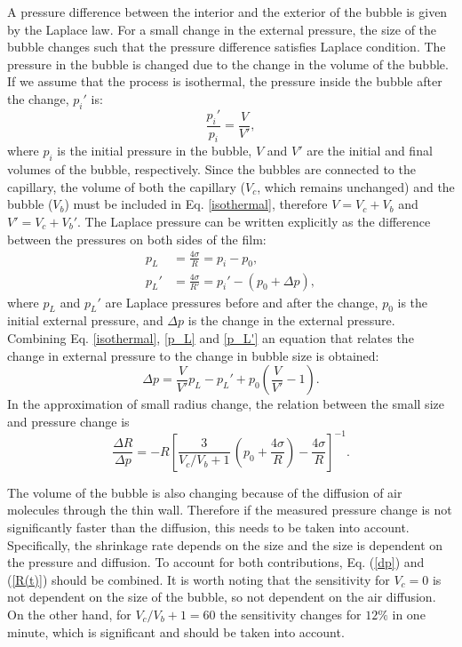 \documentclass[a4paper,12pt]{article}
\begin{document}
	A pressure difference between the interior and the exterior of the bubble is given by the Laplace law. For a small change in the external pressure, the size of the bubble changes such that the pressure difference satisfies Laplace condition.
	The pressure in the bubble is changed due to the change in the volume of the bubble.
	If we assume that the process is isothermal, the pressure inside the bubble after the change, $p_i'$ is:
	\begin{equation}
	\frac{p_i'}{p_i}=\frac{V}{V'},
	\label{isothermal}
	\end{equation}
	where $p_i$ is the initial pressure in the bubble, $V$ and $V'$ are the initial and final volumes of the bubble, respectively.	Since the bubbles are connected to the capillary, the volume of both the capillary ($V_c$, which remains unchanged) and the bubble ($V_b$) must be included in Eq. \eqref{isothermal}, therefore $V=V_c+V_b$ and $V'=V_c+V_b'$.
	The Laplace pressure can be written explicitly as the difference between the pressures on both sides of the film:
	\begin{align}
	\label{p_L}
	p_L&=\frac{4\sigma}{R}=p_i-p_0,\\ 
	\label{p_L'}
	p_L'&=\frac{4\sigma}{R'}=p_i'-(p_0+\Delta p),
	\end{align}
	where $p_L$ and $p_L'$ are Laplace pressures before and after the change, $p_0$ is the initial external pressure, and $\Delta p$ is the change in the external pressure.
	Combining  Eq. \eqref{isothermal}, \eqref{p_L} and \eqref{p_L'} an equation that relates the change in external pressure to the change in bubble size is obtained:
	\begin{equation}
	\Delta p = \frac{V}{V'}p_L - p_L' + p_0\left(\frac{V}{V'}-1\right). \label{dp}
	\end{equation}
	In the approximation of small radius change, the relation between the small size and pressure change is
	\begin{equation}
	\frac{\Delta R}{\Delta p} = - R\left[\frac{3}{V_c/V_b+1}\,\left(p_0+\frac{4\sigma}{R}\right) - \frac{4\sigma}{R}\right]^{-1}.
	\end{equation}
	
    The volume of the bubble is also changing because of the diffusion of air molecules through the thin wall. Therefore if the measured pressure change is not significantly faster than the diffusion, this needs to be taken into account. Specifically, the shrinkage rate depends on the size and the size is dependent on the pressure and diffusion. To account for both contributions, Eq. (\ref{dp}) and (\ref{R(t)}) should be combined. It is worth noting that the sensitivity for $V_c=0$ is not dependent on the size of the bubble, so not dependent on the air diffusion. On the other hand, for $V_c/V_b+1=60$ the sensitivity changes for $12\%$ in one minute, which is significant and should be taken into account.
    
\end{document}
